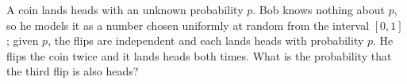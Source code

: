 A coin lands heads with an unknown probability $p$. Bob knows nothing about $p$, so he models it as a number chosen uniformly at random from the interval $[0,1]$; given $p$, the flips are independent and each lands heads with probability $p$. He flips the coin twice and it lands heads both times. What is the probability that the third flip is also heads?
